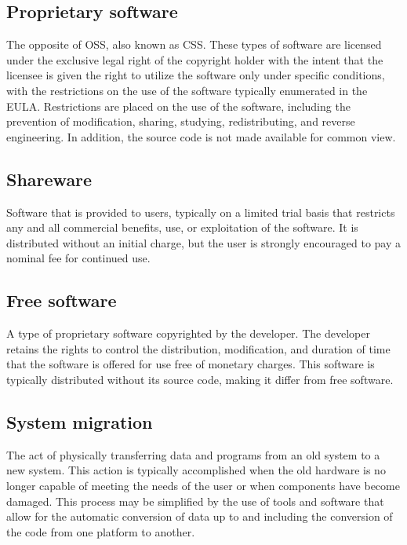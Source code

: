     \subsection*{Proprietary software}
    The opposite of OSS, also known as \ac{CSS}. These types of software are licensed under the exclusive legal right of the copyright holder with the intent that the licensee is given the right to utilize the software only under specific conditions, with the restrictions on the use of the software typically enumerated in the  \ac{EULA}. Restrictions are placed on the use of the software, including the prevention of modification, sharing, studying, redistributing, and reverse engineering. In addition, the source code is not made available for common view.
  \subsection*{Shareware}
  Software that is provided to users, typically on a limited trial basis that restricts any and all commercial benefits, use, or exploitation of the software. It is distributed without an initial charge, but the user is strongly encouraged to pay a nominal fee for continued use.   
  \subsection*{Free software}
A type of proprietary software copyrighted by the developer. The developer retains the rights to control the distribution, modification, and duration of time that the software is offered for use free of monetary charges. This software is typically distributed without its source code, making it differ from free software. 
   \subsection*{System migration}   
The act of physically transferring data and programs from an old system to a new system. This action is typically accomplished when the old hardware is no longer capable of meeting the needs of the user or when components have become damaged. This process may be simplified by the use of tools and software that allow for the automatic conversion of data up to and including the conversion of the code from one platform to another. 
